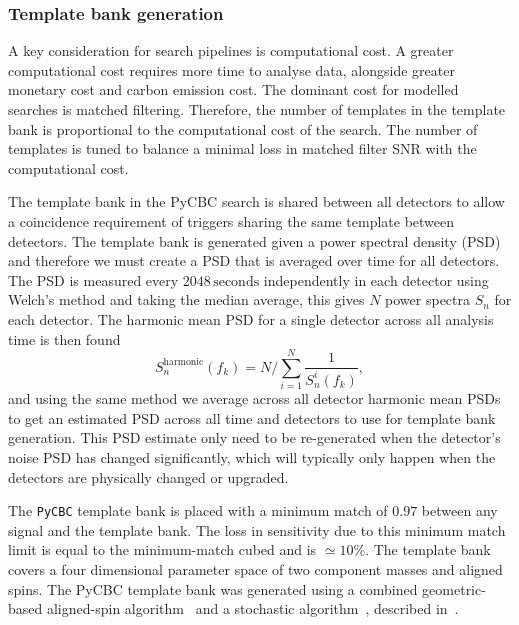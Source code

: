 \subsubsection{Template bank generation}

A key consideration for \gwadj search pipelines is computational cost. A greater computational cost requires more time to analyse \gwadj data, alongside greater monetary cost and carbon emission cost. The dominant cost for modelled searches is matched filtering. Therefore, the number of templates in the template bank is proportional to the computational cost of the search. The number of templates is tuned to balance a minimal loss in matched filter SNR with the computational cost.

The template bank in the PyCBC search is shared between all detectors to allow a coincidence requirement of triggers sharing the same template between detectors. The template bank is generated given a power spectral density (PSD) and therefore we must create a PSD that is averaged over time for all detectors. The PSD is measured every $2048 \, \text{seconds}$ independently in each detector using Welch's method and taking the median average, this gives $N$ power spectra $S_{n}$ for each detector. The harmonic mean PSD for a single detector across all analysis time is then found
%
\begin{equation}
    S_{n}^{\text{harmonic}}(f_{k}) = N / \sum^{N}_{i = 1} \frac{1}{S^{i}_{n}(f_{k})},
\end{equation}
%
and using the same method we average across all detector harmonic mean PSDs to get an estimated PSD across all time and detectors to use for template bank generation. This PSD estimate only need to be re-generated when the detector's noise PSD has changed significantly, which will typically only happen when the detectors are physically changed or upgraded.

The \texttt{PyCBC} template bank is placed with a minimum match of $0.97$ between any signal and the template bank. The loss in sensitivity due to this minimum match limit is equal to the minimum-match cubed and is ${\simeq}10\%$. The template bank covers a four dimensional parameter space of two component masses and aligned spins. The PyCBC template bank was generated using a combined geometric-based aligned-spin algorithm~\cite{Harry_Lundgren:2012, Harry_precession:2013} and a stochastic algorithm~\cite{Ajith:2012, Privitera:2013}, described in~\cite{pycbc_template_bank:2016}.

